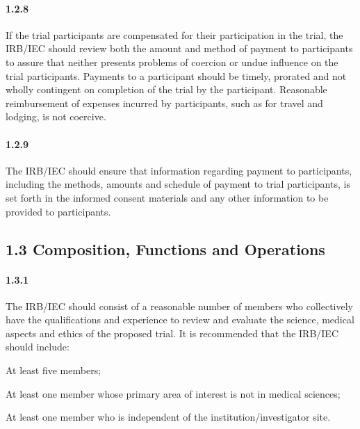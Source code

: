 \documentclass[11pt]{article}
\begin{document}
\paragraph{1.2.8} If the trial participants are compensated for their participation in the trial, the IRB/IEC should review both the amount and method of payment to participants to assure that neither presents problems of coercion or undue influence on the trial participants. Payments to a participant should be timely, prorated and not wholly contingent on completion of the trial by the participant. Reasonable reimbursement of expenses incurred by participants, such as for travel and lodging, is not coercive.

\paragraph{1.2.9} The IRB/IEC should ensure that information regarding payment to participants, including the methods, amounts and schedule of payment to trial participants, is set forth in the informed consent materials and any other information to be provided to participants.

\subsection{1.3 Composition, Functions and Operations}

\paragraph{1.3.1} The IRB/IEC should consist of a reasonable number of members who collectively have the qualifications and experience to review and evaluate the science, medical aspects and ethics of the proposed trial. It is recommended that the IRB/IEC should include:

\begin{description}[leftmargin=2.5cm,style=sameline]

\item[(a)] At least five members;

\item[(b)] At least one member whose primary area of interest is not in medical sciences;

\item[(c)] At least one member who is independent of the institution/investigator site.

\end{description}
\end{document}
